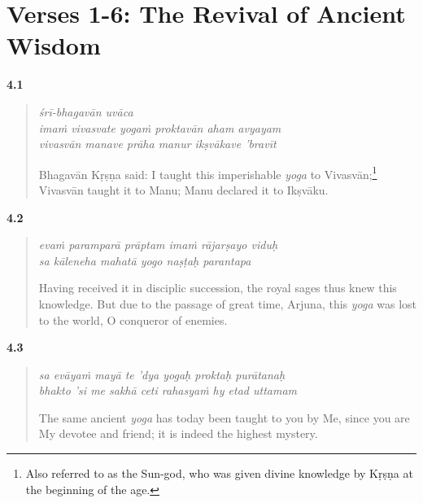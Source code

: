 \newpage
\section{Verses 1-6: The Revival of Ancient Wisdom}\label{sec-verses-1-6-the-revival-of-ancient-wisdom}

\par\noindent\textbf{4.1}\par
\begin{verse}
\textit{śrī-bhagavān uvāca} \\
\textit{imaṁ vivasvate yogaṁ proktavān aham avyayam} \\
\textit{vivasvān manave prāha manur ikṣvākave ’bravīt}

\noindent Bhagavān Kṛṣṇa said: I taught this imperishable \textit{yoga} to Vivasvān;\footnote{Also referred to as the Sun-god, who was given divine knowledge by Kṛṣṇa at the beginning of the age.} Vivasvān taught it to Manu; Manu declared it to Ikṣvāku.
\end{verse}
\par



\par\noindent\textbf{4.2}\par
\begin{verse}
\textit{evaṁ paramparā prāptam imaṁ rājarṣayo viduḥ} \\
\textit{sa kāleneha mahatā yogo naṣṭaḥ parantapa}

\noindent Having received it in disciplic succession, the royal sages thus knew this knowledge. But due to the passage of great time, Arjuna, this \textit{yoga} was lost to the world, O conqueror of enemies.
\end{verse}
\par



\par\noindent\textbf{4.3}\par
\begin{verse}
\textit{sa evāyaṁ mayā te ’dya yogaḥ proktaḥ purātanaḥ} \\
\textit{bhakto ’si me sakhā ceti rahasyaṁ hy etad uttamam}

\noindent The same ancient \textit{yoga} has today been taught to you by Me, since you are My devotee and friend; it is indeed the highest mystery.
\end{verse}
\par



